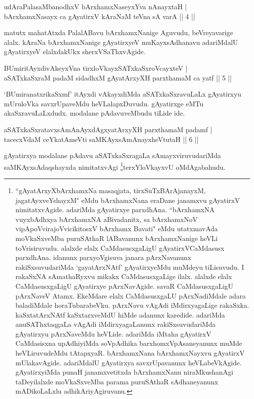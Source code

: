 \begin{shl}
udAraPalasaMbanodhxV bArxhamxNaseyxYva nAnayxtaH | \\
bArxhamxNasayx ca gAyatirxV kAraNaM teVna sA varA \hfill ||  4 || 
\end{shl}

\begin{artha} 
matutx mahatAtxda PalalABavu bArxhamxNanige Aguvudu, beVreyavarige 
alalx. kAraNa bArxhamxNanige gAyatirxyeV muKayxsAdhanavu adariMdalU 
gAyatirxyeV elalxdakUkx sherxVSaThxvAgide.
\end{artha}

\begin{shl}
BUmiritAyxdivAkeyxVna tirxloVkayxSATxkaSxroVcayxteV | \\
aSATxkaSxraM padaM sidadhxM gAyatArxyXH parxthamaM ca yatf \hfill ||  5 || 
\end{shl}

\begin{artha} 
`BUmiranatxrikaSxmf' itAyxdi vAkayxdiMda aSATxkaSxravuLaLx gAyatirxyu 
mUruloVka savxrUpaveMdu heVLalapxDuvudu. gAyatirxge eMTu 
akaSxravuLaLxdudx. modalane pAdavuveMbudu tiLide ide.
\end{artha}

\begin{shl}
aSATxkaSxratavxsAmAnAyxdAgxyatArxyXH parxthamaM padamf  | \\
tacecxVdaM ceYkatAmeVti saMKAyxsAmAnayxheVtutaH \hfill ||  6 || 
\end{shl}

\begin{artha} 
gAyatirxya modalane pAdavu aSATxkaSxragaLa sAmayxviruvudariMda 
saMKAyxsAdaqshayxda nimitatxvAgi \footnote[1]{``gAyatArxyXbArxhamxNa masaqjata, tirxSuTxBArAjanayxM, jagatAyxveYshayxM" eMdu 
bArxhamxNana eraDane janamxvu gAyatirxV nimitatxvAgide. adariMda 
gAyatirxye parxdhAna. ``bArxhamxNA vuyxbAdhxya bArxhamxNA aBivadanitx, sa bArxhamxNoV vipApoVvirajoV\s vicikitosxV bArxhamx Bavati" eMdu utatxmavAda moVkaSxveMba 
puruSAthaR lABavanunx bArxhamxNanige heVLi toVrisiruvudu. alalxde 
elalx CaMdasusxgaLigU gAyatirxVCaMdasusx parxdhAna. idanunx 
parxyoVgisuva janara pArxNavanunx rakiSxsuvudariMda `gayatArxNAtf' 
gAyatirxyeMdu muMdeyu tiLisuvudu. I rakaSxNA sAmathaRyxvu mikakx 
CaMdasusxgaLige ilalx. alalxde elalx CaMdasusxgaLigU gAyatirxye 
pArxNavAgide. savaR CaMdasusxgaLigU pArxNaveV Atamx. EkeMdare elalx 
CaMdasusxgaLU pArxNadiMdale adara baladiMdale horaTubarabeVku. 
pArxNavu vAgAdi iMdirxyagaLige rakaSxka. kaSxtatArxNAtf kaSxtarxveMdU 
hiMde adanunx karedide. adariMda anuSAThxtaqgaLa vAgAdi 
iMdirxyagaLanunx rakiSxsuvudariMda gAyatirxyu pArxNaveMdu heVLide. 
adariMda iMtaha gAyatirxV CaMdasisxna upAdhiyiMda soVpAdhika 
barxhomxVpAsaneyanunx muMde heVLiruvudeMdu tAtapxyaR. bArxhamxNana 
bArxhamxNayxvu gAyatirxV mUlakavAgide. adariMdalU gAyatirxya 
savxrUpavanunx heVLabeVkAgide. gAyatirxyiMda punaH janamxvetitxda 
bArxhamxNanu niraMkushanAgi taDeyilalxde moVkaSxveMba parama 
puruSAthaR sAdhaneyanunx mADikoLaLxlu adhikAriyAgiruvanu.}terxYloVkayxvU 
oMdAgabahudu.
\end{artha}

